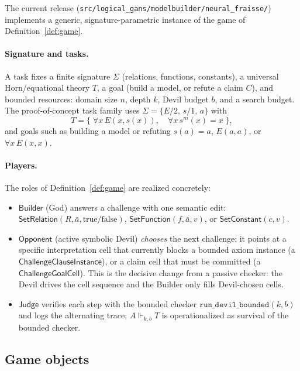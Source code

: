 \documentclass[11pt]{article}
\newcommand{\Builder}{\ensuremath{\mathsf{Builder}}}
\newcommand{\Opponent}{\ensuremath{\mathsf{Opponent}}}
\newcommand{\Judge}{\ensuremath{\mathsf{Judge}}}
\newcommand{\modelslog}{\Vdash}
\begin{document}
The current release (\texttt{src/logical\_gans/modelbuilder/neural\_fraisse/}) implements a generic, signature-parametric instance of the game of Definition~\ref{def:game}.

\paragraph{Signature and tasks.}
A task fixes a finite signature \(\Sigma\) (relations, functions, constants), a universal Horn/equational theory \(T\), a goal (build a model, or refute a claim \(C\)), and bounded resources: domain size \(n\), depth \(k\), Devil budget \(b\), and a search budget.  The proof-of-concept task family uses \(\Sigma=\{E/2,\,s/1,\,a\}\) with
\[
  T=\{\;\forall x\,E(x,s(x)),\quad \forall x\,s^m(x)=x\;\},
\]
and goals such as building a model or refuting \(s(a)=a\), \(E(a,a)\), or \(\forall x\,E(x,x)\).

\paragraph{Players.}
The roles of Definition~\ref{def:game} are realized concretely:
\begin{itemize}[leftmargin=2em]
  \item \Builder{} (God) answers a challenge with one semantic edit: \(\mathsf{SetRelation}(R,\bar a,\text{true/false})\), \(\mathsf{SetFunction}(f,\bar a,v)\), or \(\mathsf{SetConstant}(c,v)\).
  \item \Opponent{} (active symbolic Devil) \emph{chooses} the next challenge: it points at a specific interpretation cell that currently blocks a bounded axiom instance (a \(\mathsf{ChallengeClauseInstance}\)), or a claim cell that must be committed (a \(\mathsf{ChallengeGoalCell}\)).  This is the decisive change from a passive checker: the Devil drives the cell sequence and the Builder only fills Devil-chosen cells.
  \item \Judge{} verifies each step with the bounded checker \(\texttt{run\_devil\_bounded}(k,b)\) and logs the alternating trace; \(A\modelslog_{k,b}T\) is operationalized as survival of the bounded checker.
\end{itemize}

\subsection{Game objects}
\end{document}
